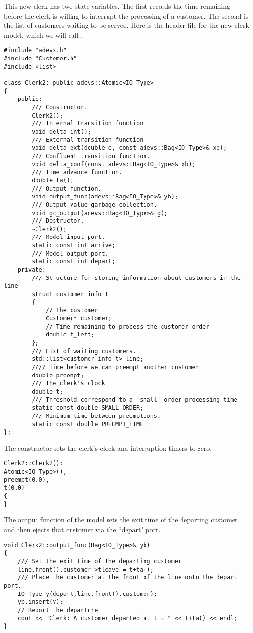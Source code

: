 This new clerk has two state variables. The first records the time remaining before the clerk is willing to interrupt the processing of a customer. The second is the list of customers waiting to be served. Here is the header file for the new clerk model, which we will call .
\begin{verbatim}
#include "adevs.h"
#include "Customer.h"
#include <list>

class Clerk2: public adevs::Atomic<IO_Type> 
{
    public:
        /// Constructor.
        Clerk2();
        /// Internal transition function.
        void delta_int();
        /// External transition function.
        void delta_ext(double e, const adevs::Bag<IO_Type>& xb);
        /// Confluent transition function.
        void delta_conf(const adevs::Bag<IO_Type>& xb);
        /// Time advance function.
        double ta();
        /// Output function.  
        void output_func(adevs::Bag<IO_Type>& yb);
        /// Output value garbage collection.
        void gc_output(adevs::Bag<IO_Type>& g);
        /// Destructor.
        ~Clerk2();
        /// Model input port.
        static const int arrive;
        /// Model output port.
        static const int depart;
    private:    
        /// Structure for storing information about customers in the line
        struct customer_info_t
        {
            // The customer
            Customer* customer;
            // Time remaining to process the customer order
            double t_left;
        };
        /// List of waiting customers.
        std::list<customer_info_t> line;
        //// Time before we can preempt another customer
        double preempt;
        /// The clerk's clock
        double t;
        /// Threshold correspond to a 'small' order processing time
        static const double SMALL_ORDER;
        /// Minimum time between preemptions.
        static const double PREEMPT_TIME;
}; 
\end{verbatim}

The  constructor sets the clerk's clock and interruption timers to zero.
\begin{verbatim}
Clerk2::Clerk2():
Atomic<IO_Type>(),
preempt(0.0),
t(0.0)
{
}
\end{verbatim}
The output function of the  model sets the exit time of the departing customer and then ejects that customer via the ``depart" port.
\begin{verbatim}
void Clerk2::output_func(Bag<IO_Type>& yb)
{
    /// Set the exit time of the departing customer
    line.front().customer->tleave = t+ta();
    /// Place the customer at the front of the line onto the depart port.
    IO_Type y(depart,line.front().customer);
    yb.insert(y);
    // Report the departure
    cout << "Clerk: A customer departed at t = " << t+ta() << endl;
}
\end{verbatim}

